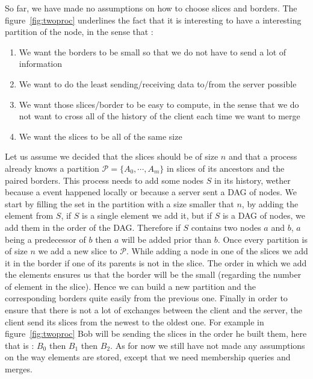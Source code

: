 So far, we have made no assumptions on how to choose slices and borders. The figure~\ref{fig:twoproc} underlines the fact that it is interesting to have a interesting partition of the node, in the sense that :
\begin{enumerate}
 \item We want the borders to be small so that we do not have to send a lot of information
 \item We want to do the least sending/receiving data to/from the server possible
 \item We want those slices/border to be easy to compute, in the sense that we do not want to cross all of the history of the client each time we want to merge
 \item We want the slices to be all of the same size
\end{enumerate}
Let us assume we decided that the slices should be of size $n$ and that a process already knows a partition $\mathcal{P} = \{A_0,\cdots,A_m\}$ in slices of its ancestors and the paired borders. This process needs to add some nodes $S$ in its history, wether because a event happened locally or because a server sent a DAG of nodes. We start by filling the set in the partition with a size smaller that $n$, by adding the element from $S$, if $S$ is a single element we add it, but if $S$ is a DAG of nodes, we add them in the order of the DAG. Therefore if $S$ contains two nodes $a$ and $b$, $a$ being a predecessor of $b$ then $a$ will be added prior than $b$. Once every partition is of size $n$ we add a new slice to $\mathcal P$. While adding a node in one of the slices we add it in the border if one of its parents is not in the slice. The order in which we add the elements ensures us that the border will be the small (regarding the number of element in the slice). Hence we can build a new partition and the corresponding borders quite easily from the previous one. Finally in order to ensure that there is not a lot of exchanges between the client and the 
server, the client send its slices from the newest to the oldest one. For example in figure~\ref{fig:twoproc} Bob will be sending the slices in the order he built them, here that is : $B_0$ then $B_1$ then $B_2$.
As for now we still have not made any assumptions on the way elements are stored, except that we need membership queries and merges.
